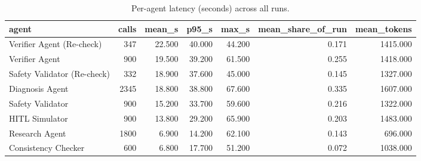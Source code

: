 \begin{table}[t]
\centering
\small
\begin{tabular}{lrrrrrr}
\toprule
agent & calls & mean\_s & p95\_s & max\_s & mean\_share\_of\_run & mean\_tokens \\
\midrule
Verifier Agent (Re-check) & 347 & 22.500 & 40.000 & 44.200 & 0.171 & 1415.000 \\
Verifier Agent & 900 & 19.500 & 39.200 & 61.500 & 0.255 & 1418.000 \\
Safety Validator (Re-check) & 332 & 18.900 & 37.600 & 45.000 & 0.145 & 1327.000 \\
Diagnosis Agent & 2345 & 18.800 & 38.800 & 67.600 & 0.335 & 1607.000 \\
Safety Validator & 900 & 15.200 & 33.700 & 59.600 & 0.216 & 1322.000 \\
HITL Simulator & 900 & 13.800 & 29.200 & 65.900 & 0.203 & 1483.000 \\
Research Agent & 1800 & 6.900 & 14.200 & 62.100 & 0.143 & 696.000 \\
Consistency Checker & 600 & 6.800 & 17.700 & 51.200 & 0.072 & 1038.000 \\
\bottomrule
\end{tabular}
\caption{Per-agent latency (seconds) across all runs.}
\label{tab:rigor_latency}
\end{table}
